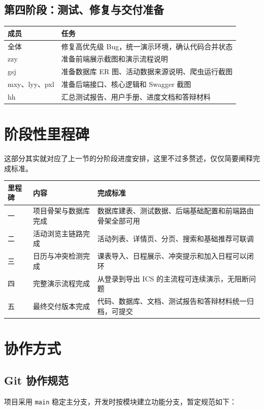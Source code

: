 \documentclass[UTF8,a4paper,12pt,fontset=none]{ctexrep}
\begin{document}
\section{第四阶段：测试、修复与交付准备}
\begin{longtable}{|p{}|p{}|}
\hline
\textbf{成员} & \textbf{任务} \\
\hline
全体 & 修复高优先级 Bug，统一演示环境，确认代码合并状态 \\
\hline
zzy & 准备前端展示截图和演示流程说明 \\
\hline
gsj & 准备数据库 ER 图、活动数据来源说明、爬虫运行截图 \\
\hline
mxy、lyy、pxl & 准备后端接口、核心逻辑和 Swagger 截图 \\
\hline
hh & 汇总测试报告、用户手册、进度文档和答辩材料 \\
\hline
\end{longtable}

\chapter{阶段性里程碑}
这部分其实就对应了上一节的分阶段进度安排，这里不过多赘述，仅仅简要阐释完成标准。
\begin{longtable}{|p{}|p{}|p{}|}
\hline
\textbf{里程碑} & \textbf{内容} & \textbf{完成标准} \\
\hline
一 & 项目骨架与数据库完成 & 数据库建表、测试数据、后端基础配置和前端路由骨架全部可用 \\
\hline
二 & 活动浏览主链路完成 & 活动列表、详情页、分页、搜索和基础推荐可联调 \\
\hline
三 & 日历与冲突检测完成 & 课表导入、日程展示、冲突提示和加入日程可以闭环 \\
\hline
四 & 完整演示流程完成 & 从登录到导出 ICS 的主流程可连续演示，无阻断问题 \\
\hline
五 & 最终交付版本完成 & 代码、数据库、文档、测试报告和答辩材料统一归档，可提交 \\
\hline
\end{longtable}

\chapter{协作方式}

\section{Git 协作规范}
项目采用 \texttt{main} 稳定主分支，开发时按模块建立功能分支，暂定规范如下：
\end{document}

